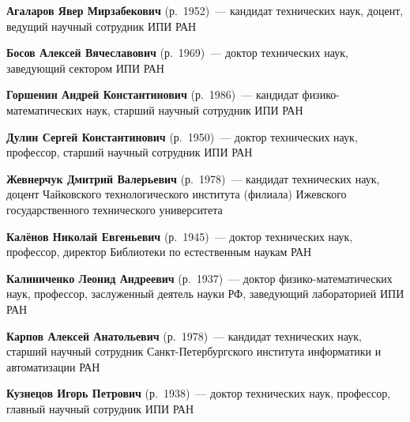\begin{multicols}{2}


\noindent
\textbf{Агаларов Явер Мирзабекович} (р.\ 1952)~---  кандидат технических наук,
доцент, ведущий научный сотрудник ИПИ РАН

\vspace*{5pt}


\noindent
\textbf{Босов Алексей Вячеславович} (р.\ 1969)~--- доктор технических наук, заведующий
сектором ИПИ РАН

\vspace*{5pt}

\noindent
\textbf{Горшенин Андрей Константинович} (р.\ 1986)~--- 
кандидат фи\-зи\-ко-математических  наук, старший научный сотрудник  ИПИ РАН

\vspace*{5pt}

\noindent
\textbf{Дулин Сергей Константинович} (р.\ 1950)~--- доктор технических наук, 
профессор, старший научный сотрудник ИПИ РАН

\vspace*{5pt}

\noindent
\textbf{Жевнерчук Дмитрий Валерьевич} (р.\ 1978)~--- кандидат технических наук, доцент 
Чайковского технологического института (филиала) Ижевского государственного технического 
университета

\vspace*{5pt}

\noindent
\textbf{Калёнов Николай Евгеньевич} (р.\ 1945)~---  доктор технических наук,
профессор, директор Библиотеки по естественным наукам РАН

\vspace*{5pt}


\noindent
\textbf{Калиниченко Леонид Андреевич} (р.\ 1937)~--- 
доктор фи\-зи\-ко-математических  наук, профессор, 
заслуженный деятель науки РФ, за\-ве\-ду\-ющий лабораторией ИПИ РАН

\vspace*{5pt}


\noindent
\textbf{Карпов Алексей Анатольевич} (р.\ 1978)~--- 
кандидат технических наук, старший научный сотрудник Санкт-Пе\-тер\-бург\-ско\-го
института информатики и автоматизации РАН

\vspace*{5pt}

\noindent
\textbf{Кузнецов Игорь Петрович} (р.\ 1938)~--- 
доктор технических наук, профессор, главный научный сотрудник ИПИ РАН


\end{multicols}
